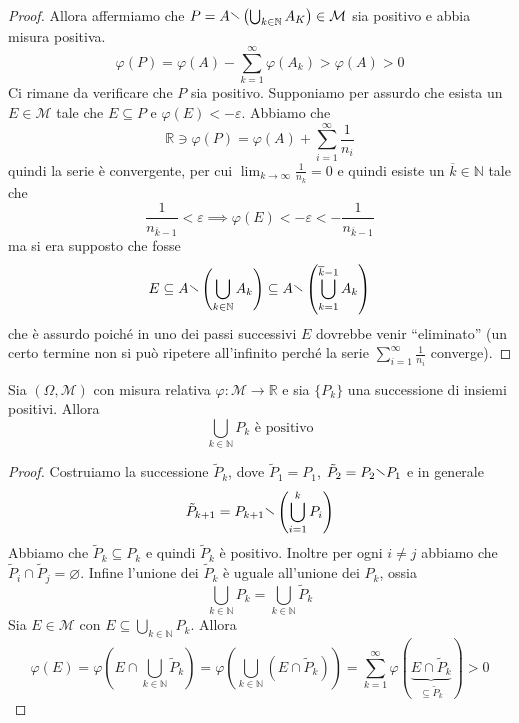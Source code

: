 \begin{proof}
    Allora affermiamo che \(P = A \sminus \left( \bigcup_{k \in \mathbb{N}} A_K
    \right) \in \mathcal{M}\) sia positivo e abbia misura positiva.
    \[
        \varphi(P) = \varphi(A) - \sum_{k=1}^{\infty} \varphi(A_{k}) >
        \varphi(A) > 0
    \]
    Ci rimane da verificare che \(P\) sia positivo. Supponiamo per assurdo che
    esista un \(E \in \mathcal{M}\) tale che \(E \subseteq P \) e \(\varphi(E) <
    -\varepsilon\). Abbiamo che
    \[
        \mathbb{R} \ni \varphi(P) = \varphi(A) + \sum_{i=1}^{\infty}
        \frac{1}{n_{i}} 
    \]
    quindi la serie è convergente, per cui \(\lim_{k \to \infty} \frac{1}{n_k} =
    0\) e quindi esiste un \(\overline{k} \in \mathbb{N}\) tale che 
    \[
        \frac{1}{n_{\overline{k} - 1}} < \varepsilon \implies \varphi(E) <
        -\varepsilon < -\frac{1}{n_{\overline{k} - 1}}
    \]
    ma si era supposto che fosse 
    \[
        E \subseteq A \sminus \left( \bigcup_{k \in \mathbb{N}} A_k \right)
        \subseteq A \sminus \left( \bigcup_{k=1}^{\overline{k}-1} A_k \right)  
    \]
    che è assurdo poiché in uno dei passi successivi \(E\) dovrebbe venir
    ``eliminato'' (un certo termine non si può ripetere all'infinito perché la
    serie \(\sum_{i=1}^{\infty} \frac{1}{n_{i}}\) converge).
\end{proof}
\begin{lemma}
    Sia \((\Omega, \mathcal{M})\) con misura relativa \(\varphi : \mathcal{M}
    \to \mathbb{R}\) e sia \(\{P_k\} \) una successione di insiemi positivi.
    Allora 
    \[
        \bigcup_{k \in \mathbb{N}} P_k \text{ è positivo}
    \]
\end{lemma}
\begin{proof}
    Costruiamo la successione \({\tilde{P}_k}\), dove \(\tilde{P}_1 = P_{1}\),
    \(\tilde{P}_2 = P_{2} \sminus P_{1}\) e in generale
    \[
        \tilde{P}_{k+1}  = P_{k+1} \sminus \left( \bigcup_{i=1}^{k} P_{i}
            \right)
    \]
    Abbiamo che \(\tilde{P}_{k} \subseteq P_{k}\) e quindi \(\tilde{P}_{k}\) è
    positivo. Inoltre per ogni \(i \neq j\) abbiamo che \(\tilde{P}_{i} \cap
    \tilde{P}_{j} = \varnothing\). Infine l'unione dei \(\tilde{P}_{k}\) è
    uguale all'unione dei \(P_{k}\), ossia
    \[
        \bigcup_{k \in \mathbb{N}} P_k = \bigcup_{k \in \mathbb{N}} \tilde{P}_k 
    \]
    Sia \(E \in \mathcal{M}\) con \(E \subseteq \bigcup_{k \in \mathbb{N}} P_k\).
    Allora
    \[
        \varphi(E) = \varphi\left(E \cap \bigcup_{k \in \mathbb{N}} \tilde{P}_k
        \right) = \varphi\left( \bigcup_{k \in \mathbb{N}} \left( E \cap
        \tilde{P}_k \right)   \right) = \sum_{k=1}^{\infty}
        \varphi(\underbrace{E \cap
        \tilde{P}_k}_{\subseteq \tilde{P}_k })  > 0
    \]
\end{proof}
